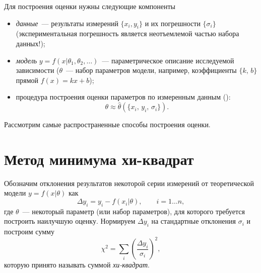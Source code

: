 %

Для построения оценки нужны следующие компоненты
\begin{itemize}
    \item \emph{данные}~--- результаты измерений $\{x_i, y_i\}$
    и их погрешности $\{\sigma_i\}$
    (экспериментальная погрешность является неотъемлемой
    частью набора данных!);
    \item \emph{модель} $y=f(x | {\theta_1,\theta_2,\ldots })$~---
параметрическое описание исследуемой зависимости
($\theta$~--- набор параметров модели, например,
коэффициенты $\{k,\,b\}$ прямой $f(x)=kx+b$);
\item процедура построения оценки параметров по
измеренным данным ():
\[
\theta \approx \hat{\theta}(\{x_i,\,y_i,\,\sigma_i\}).
\]
\end{itemize}

Рассмотрим самые распространенные способы построения оценки.

\section{Метод минимума хи-квадрат}
\label{sec:chi2}

Обозначим отклонения результатов некоторой серии измерений от теоретической
модели $y=f(x| \theta)$ как
\[
 \Delta y_i = y_i- f(x_i | \theta),\qquad i= 1\ldots n,
\]
где $\theta$~--- некоторый параметр (или набор параметров),
для которого требуется построить наилучшую оценку. Нормируем $\Delta y_i$
на стандартные отклонения $\sigma_i$ и построим сумму
\begin{equation}
    \chi^2 = \sum_i{\left(\frac{\Delta y_i}{\sigma_i}\right)^2},
    \label{eq:chi2}
\end{equation}
которую принято называть суммой \emph{хи-квадрат}.

